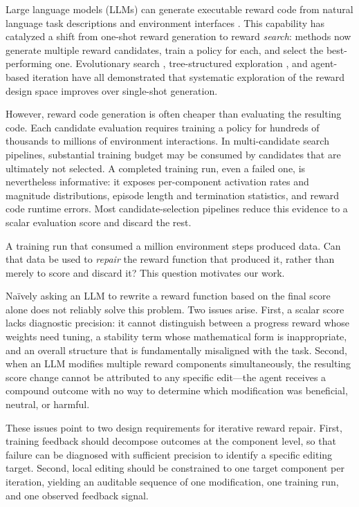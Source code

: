 \documentclass[letterpaper,twocolumn,10pt]{article}
\begin{document}
Large language models (LLMs) can generate executable reward code from natural language task descriptions and environment interfaces \cite{eureka,text2reward,language2rewards}. This capability has catalyzed a shift from one-shot reward generation to reward \emph{search}: methods now generate multiple reward candidates, train a policy for each, and select the best-performing one. Evolutionary search \cite{eureka}, tree-structured exploration \cite{rfagent}, and agent-based iteration \cite{card,rda} have all demonstrated that systematic exploration of the reward design space improves over single-shot generation.

However, reward code generation is often cheaper than evaluating the resulting code. Each candidate evaluation requires training a policy for hundreds of thousands to millions of environment interactions. In multi-candidate search pipelines, substantial training budget may be consumed by candidates that are ultimately not selected. A completed training run, even a failed one, is nevertheless informative: it exposes per-component activation rates and magnitude distributions, episode length and termination statistics, and reward code runtime errors. Most candidate-selection pipelines reduce this evidence to a scalar evaluation score and discard the rest.

A training run that consumed a million environment steps produced data. Can that data be used to \emph{repair} the reward function that produced it, rather than merely to score and discard it? This question motivates our work.

Na\"ively asking an LLM to rewrite a reward function based on the final score alone does not reliably solve this problem. Two issues arise. First, a scalar score lacks diagnostic precision: it cannot distinguish between a progress reward whose weights need tuning, a stability term whose mathematical form is inappropriate, and an overall structure that is fundamentally misaligned with the task. Second, when an LLM modifies multiple reward components simultaneously, the resulting score change cannot be attributed to any specific edit---the agent receives a compound outcome with no way to determine which modification was beneficial, neutral, or harmful.

These issues point to two design requirements for iterative reward repair. First, training feedback should decompose outcomes at the component level, so that failure can be diagnosed with sufficient precision to identify a specific editing target. Second, local editing should be constrained to one target component per iteration, yielding an auditable sequence of one modification, one training run, and one observed feedback signal.
\end{document}
